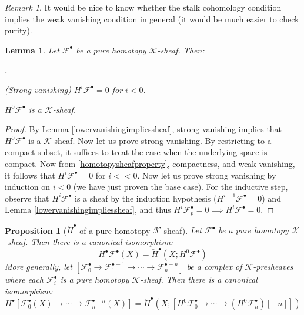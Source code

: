 \documentclass[12pt]{article}
\newtheorem{lemma}[theorem]{Lemma}
\newtheorem{proposition}[theorem]{Proposition}
\theoremstyle{definition}
\theoremstyle{remark}
\newtheorem{remark}[theorem]{Remark}
\numberwithin{equation}{subsection}
\newcommand{\F}{\mathcal F}
\newcommand{\K}{\mathcal K}
\newcommand{\cH}{\check H}
\newcounter{rcounti}
\newenvironment{rlist}{\begin{list}{\roman{rcounti}.}{\usecounter{rcounti}
\setlength\itemsep{0pt}
\setlength\labelsep{4pt}
\setlength\labelwidth{16pt}
\setlength\leftmargin{32pt}
\setlength\listparindent{0pt}
\setlength\parsep{0pt}
\setlength\parskip{0pt}
\setlength\partopsep{0pt}
\setlength\rightmargin{0pt}
\setlength\topsep{0pt}
\setlength\itemindent{0pt}
}}{\end{list}}
\begin{document}
\begin{remark}
It would be nice to know whether the stalk cohomology condition implies the weak vanishing condition in general (it would be much easier to check purity).
\end{remark}

\begin{lemma}\label{cechsimplebasic}
Let $\F^\bullet$ be a pure homotopy $\K$-sheaf.  Then:
\begin{rlist}
\item(Strong vanishing) $H^i\F^\bullet=0$ for $i<0$.
\item$H^0\F^\bullet$ is a $\K$-sheaf.
\end{rlist}
\end{lemma}

\begin{proof}
By Lemma \ref{lowervanishingimpliessheaf}, strong vanishing implies that $H^0\F^\bullet$ is a $\K$-sheaf.  Now let us prove strong vanishing.  By restricting to a compact subset, it suffices to treat the case when the underlying space is compact.  Now from \eqref{homotopysheafproperty}, compactness, and weak vanishing, it follows that $H^i\F^\bullet=0$ for $i<<0$.  Now let us prove strong vanishing by induction on $i<0$ (we have just proven the base case).  For the inductive step, observe that $H^i\F^\bullet$ is a sheaf by the induction hypothesis ($H^{i-1}\F^\bullet=0$) and Lemma \ref{lowervanishingimpliessheaf}, and thus $H^i\F^\bullet_p=0\implies H^i\F^\bullet=0$.
\end{proof}

\begin{proposition}[$\cH^\bullet$ of a pure homotopy $\K$-sheaf]\label{cechcohomologypurehomotopysheaf}
Let $\F^\bullet$ be a pure homotopy $\K$-sheaf.  Then there is a canonical isomorphism:
\begin{equation}
H^\bullet\F^\bullet(X)=\cH^\bullet(X;H^0\F^\bullet)
\end{equation}
More generally, let $[\F^\bullet_0\to\F^{\bullet-1}_1\to\cdots\to\F^{\bullet-n}_n]$ be a complex of $\K$-presheaves where each $\F^\bullet_i$ is a pure homotopy $\K$-sheaf.  Then there is a canonical isomorphism:
\begin{equation}\label{cechsimplecanonicaliso}
H^\bullet[\F^\bullet_0(X)\to\cdots\to\F^{\bullet-n}_n(X)]=\cH^\bullet(X;[H^0\F^\bullet_0\to\cdots\to(H^0\F^\bullet_n)[-n]])
\end{equation}
\end{proposition}
\end{document}
